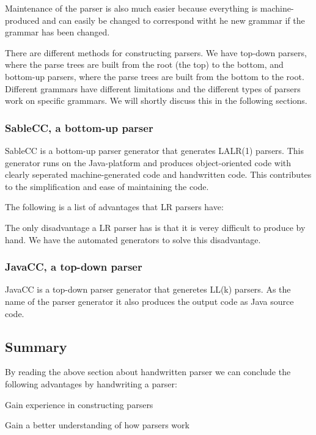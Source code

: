 Maintenance of the parser is also much easier because everything is machine-produced and can easily be changed to correspond witht he new grammar if the grammar has been changed.

There are different methods for constructing parsers. We have top-down parsers, where the parse trees are built from the root (the top) to the bottom, and bottom-up parsers, where the parse trees are built from the bottom to the root. Different grammars have different limitations and  the different types of parsers work on specific grammars. We will shortly discuss this in the following sections.

\subsubsection{SableCC, a bottom-up parser}
\label{sec:ana-sablecc}
SableCC is a bottom-up parser generator that generates LALR(1) parsers. This generator runs on the Java-platform and produces object-oriented code with clearly seperated machine-generated code and handwritten code. This contributes to the simplification and ease of maintaining the code.\cite[pp. 11]{sableccdoc}

The following is a list of advantages that LR parsers have:\cite[pp. 193]{sebesta2013} 


The only disadvantage a LR parser has is that it is verey difficult to produce by hand. We have the automated generators to solve this disadvantage.

\subsubsection{JavaCC, a top-down parser}
\label{sec:ana-javacc}
JavaCC is a top-down parser generator that generetes LL(k) parsers. As the name of the parser generator it also produces the output code as Java source code.\cite{wiki-javacc}

\subsection{Summary}
\label{sec:ana-parsersum}
By reading the above section about handwritten parser we can conclude the following advantages by handwriting a parser:

\begin{dlist}
\item Gain experience in constructing parsers
\item Gain a better understanding of how parsers work
\end{dlist}

